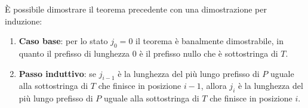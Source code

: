\begin{dimostrazione}
    È possibile dimostrare il teorema precedente con una dimostrazione per
    induzione:
    \begin{enumerate}
        \item \textbf{Caso base}: per lo stato $j_0 = 0$ il teorema è banalmente
              dimostrabile, in quanto il prefisso di lunghezza $0$ è il prefisso
              nullo che è sottostringa di $T$.
        \item \textbf{Passo induttivo}: se $j_{i - 1}$ è la lunghezza del più
              lungo prefisso di $P$ uguale alla sottostringa di $T$ che finisce
              in posizione $i - 1$, allora $j_i$ è la lunghezza del più lungo
              prefisso di $P$ uguale alla sottostringa di $T$ che finisce in
              posizione $i$.


\end{enumerate}
\end{dimostrazione}
